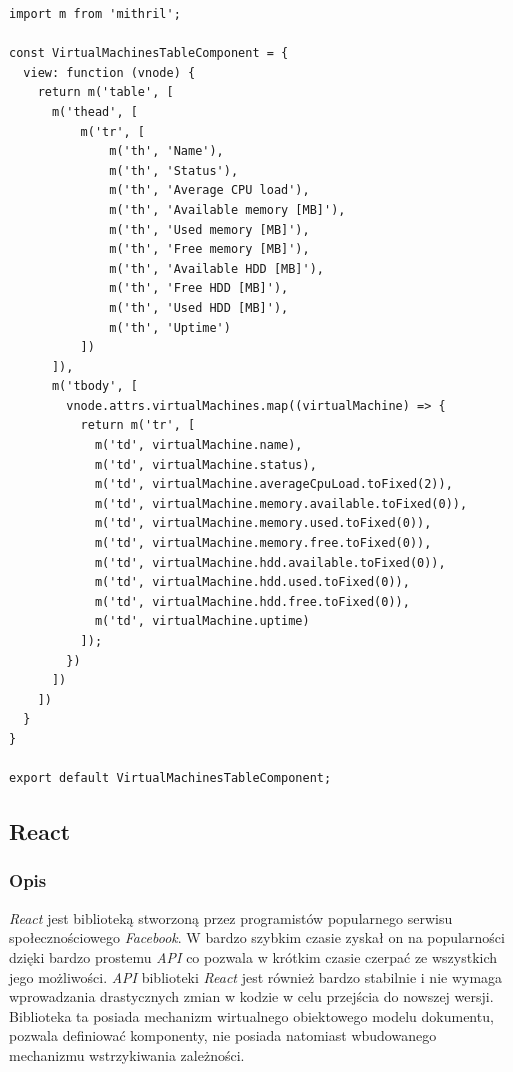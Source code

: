 \documentclass[polish, twoside, 12pt]{mwart}
\begin{document}
\begin{lstlisting}[caption=Komponent tabeli]
import m from 'mithril';

const VirtualMachinesTableComponent = {
  view: function (vnode) {
    return m('table', [
      m('thead', [
          m('tr', [
              m('th', 'Name'),
              m('th', 'Status'),
              m('th', 'Average CPU load'),
              m('th', 'Available memory [MB]'),
              m('th', 'Used memory [MB]'),
              m('th', 'Free memory [MB]'),
              m('th', 'Available HDD [MB]'),
              m('th', 'Free HDD [MB]'),
              m('th', 'Used HDD [MB]'),
              m('th', 'Uptime')
          ])
      ]),
      m('tbody', [
        vnode.attrs.virtualMachines.map((virtualMachine) => {
          return m('tr', [
            m('td', virtualMachine.name),
            m('td', virtualMachine.status),
            m('td', virtualMachine.averageCpuLoad.toFixed(2)),
            m('td', virtualMachine.memory.available.toFixed(0)),
            m('td', virtualMachine.memory.used.toFixed(0)),
            m('td', virtualMachine.memory.free.toFixed(0)),
            m('td', virtualMachine.hdd.available.toFixed(0)),
            m('td', virtualMachine.hdd.used.toFixed(0)),
            m('td', virtualMachine.hdd.free.toFixed(0)),
            m('td', virtualMachine.uptime)
          ]);
        })
      ])
    ])
  }
}

export default VirtualMachinesTableComponent;
\end{lstlisting}

\subsection{React}

\subsubsection{Opis}

\emph{React} jest biblioteką stworzoną przez programistów popularnego serwisu społecznościowego \emph{Facebook}. W bardzo szybkim czasie zyskał on na popularności dzięki bardzo prostemu \emph{API} co pozwala w krótkim czasie czerpać ze wszystkich jego możliwości. \emph{API} biblioteki \emph{React} jest również bardzo stabilnie i nie wymaga wprowadzania drastycznych zmian w kodzie w celu przejścia do nowszej wersji. Biblioteka ta posiada mechanizm wirtualnego obiektowego modelu dokumentu, pozwala definiować komponenty, nie posiada natomiast wbudowanego mechanizmu wstrzykiwania zależności.
\end{document}
